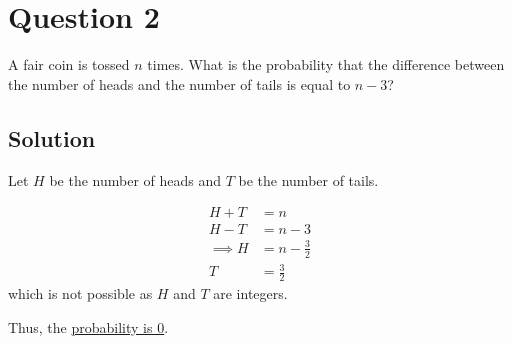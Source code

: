 \section*{Question 2}

A fair coin is tossed \(n\) times.
What is the probability that the difference between the number of heads and the number of tails is equal to \(n - 3\)?

\subsection*{Solution}

Let \(H\) be the number of heads and \(T\) be the number of tails.

\begin{align*}
    H + T & = n               \\
    H - T & = n - 3           \\
    \implies
    H     & = n - \frac{3}{2} \\
    T     & = \frac{3}{2}
\end{align*}
which is not possible as \(H\) and \(T\) are integers.

Thus, the \underline{probability is 0}.
